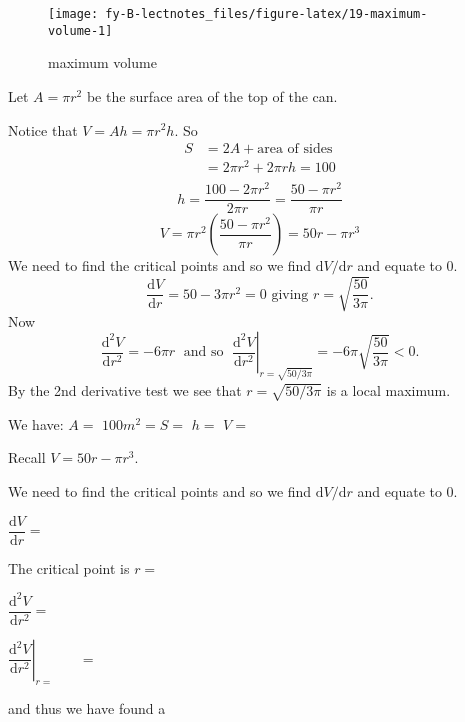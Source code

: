 \documentclass[
  english,
  11pt,
  oneside]{book}
\newcommand{\slide}{}
\theoremstyle{definition}
\theoremstyle{definition}
\theoremstyle{definition}
\theoremstyle{definition}
\theoremstyle{remark}
\begin{document}
\begin{figure}

{\centering \texttt{[image: fy-B-lectnotes\_files/figure-latex/19-maximum-volume-1]} 

}

\caption{maximum volume}\label{fig:19-maximum-volume}
\end{figure}
\slide

\begin{notslides}

Let \(A=\pi r^2\) be the surface area of the top of the can.

Notice that \(V = Ah = \pi r^2h\). So
\[
\begin{array}{rl}
S&=2A + \text{area of sides}\\
&=2\pi r^2 + 2\pi rh = 100\\
\end{array}
\]
\[
h=\frac{100-2\pi r^2}{2\pi r}=\frac{50-\pi r^2}{\pi r}
\]
\[
V=\pi r^2\left(\frac{50-\pi r^2}{\pi r}\right) = 50r -\pi r^3
\]
We need to find the critical points and so we find \(\mathrm{d}V/\mathrm{d} r\) and equate to 0.
\[
\frac{\mathrm{d} V}{\mathrm{d} r} = 50-3\pi r^2 = 0\text{ giving }r = \sqrt{\frac{50}{3\pi}}.
\]
Now
\[
\frac{\mathrm{d}^2 V}{\mathrm{d}r^2} = -6\pi r\;\text{ and so }\;\left.\frac{\mathrm{d}^2 V}{\mathrm{d}r^2}\right\vert_{r=\sqrt{50/3\pi}} = -6\pi\sqrt{\frac{50}{3\pi}}<0.
\]
By the 2nd derivative test we see that \(r=\sqrt{50/3\pi}\) is a local maximum.

\end{notslides}

\begin{slidesonly}

We have: \(A=\)
\vfill
\(100m^2=S=\)
\vfill
\(h=\)
\vfill
\(V=\)
\vfill
\slide
Recall \(V=50r-\pi r^3\).

We need to find the critical points and so we find \(\mathrm{d}V/\mathrm{d} r\) and equate to 0.

\(\dfrac{\mathrm{d} V}{\mathrm{d} r} =\)

\vfill

The critical point is \(r=\)

\vfill

\(\dfrac{\mathrm{d}^2 V}{\mathrm{d}r^2} =\)

\vfill

\(\left.\dfrac{\mathrm{d}^2 V}{\mathrm{d}r^2}\right\vert_{r=\phantom{adsfa}} =\)

and thus we have found a
\slide

\end{slidesonly}
\end{document}
